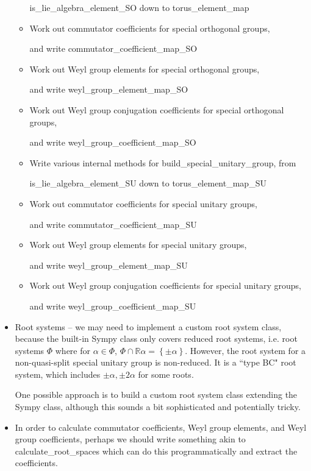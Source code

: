 \documentclass[12pt]{article}
\newcommand{\R}{\mathbb{R}}
\newcommand{\lb}{\left\{}
\newcommand{\rb}{\right\}}
\begin{document}
\begin{itemize}
\begin{itemize}
		is\_lie\_algebra\_element\_SO down to torus\_element\_map\

		\item Work out commutator coefficients for special orthogonal groups, 

and write commutator\_coefficient\_map\_SO

		\item Work out Weyl group elements for special orthogonal groups, 

and write weyl\_group\_element\_map\_SO

		\item Work out Weyl group conjugation coefficients for special orthogonal groups, 

and write weyl\_group\_coefficient\_map\_SO

		\item Write various internal methods for build\_special\_unitary\_group, from 

		is\_lie\_algebra\_element\_SU down to torus\_element\_map\_SU

		\item Work out commutator coefficients for special unitary groups, 

and write commutator\_coefficient\_map\_SU

		\item Work out Weyl group elements for special unitary groups, 

and write weyl\_group\_element\_map\_SU

		\item Work out Weyl group conjugation coefficients for special unitary groups, 

and write weyl\_group\_coefficient\_map\_SU
	\end{itemize}
	\item Root systems -- we may need to implement a custom root system class, because the built-in Sympy class only covers reduced root systems, i.e. root systems $\Phi$ where for $\alpha \in \Phi$, $\Phi \cap \R \alpha = \lb \pm \alpha \rb$. However, the root system for a non-quasi-split special unitary group is non-reduced. It is a ``type BC" root system, which includes $\pm \alpha, \pm 2\alpha$ for some roots.

	One possible approach is to build a custom root system class extending the Sympy class, although this sounds a bit sophisticated and potentially tricky.

	\item In order to calculate commutator coefficients, Weyl group elements, and Weyl group coefficients, perhaps we should write something akin to calculate\_root\_spaces which can do this programmatically and extract the coefficients.
\end{itemize}
\end{document}

